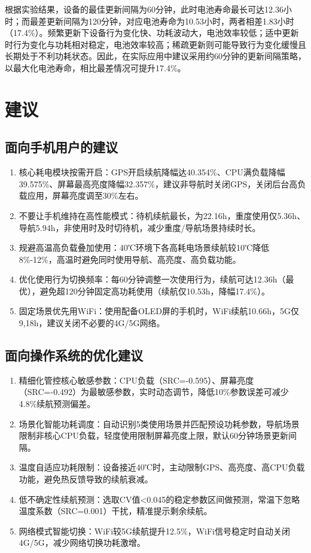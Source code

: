 \documentclass{mcmthesis}  %
\begin{document}
	根据实验结果，设备的最佳更新间隔为60分钟，此时电池寿命最长可达12.36小时；而最差更新间隔为120分钟，对应电池寿命为10.53小时，两者相差1.83小时（17.4\%）。频繁更新下设备行为变化快、功耗波动大，电池效率较低；适中更新时行为变化与功耗相对稳定，电池效率较高；稀疏更新则可能导致行为变化缓慢且长期处于不利功耗状态。因此，在实际应用中建议采用约60分钟的更新间隔策略，以最大化电池寿命，相比最差情况可提升17.4\%。
	
	
	
	\section{建议}  %
	\subsection{面向手机用户的建议}
	
	
	\begin{enumerate}[label=\arabic*.]
		\item 核心耗电模块按需开启：GPS开启续航降幅达40.354\%、CPU满负载降幅39.575\%、屏幕最高亮度降幅32.357\%，建议非导航时关闭GPS，关闭后台高负载应用，屏幕亮度调至30\%左右。
		\item 不要让手机维持在高性能模式：待机续航最长，为22.16h，重度使用仅5.36h、导航5.94h，非使用时及时切待机，减少重度/导航场景持续时长。
		\item 规避高温高负载叠加使用：40℃环境下各高耗电场景续航较10℃降低8\%-12\%，高温时避免同时使用导航、高亮度、高负载功能。
		\item 优化使用行为切换频率：每60分钟调整一次使用行为，续航可达12.36h（最优），避免超120分钟固定高功耗使用（续航仅10.53h，降幅17.4\%）。
		\item 固定场景优先用WiFi：使用配备OLED屏的手机时，WiFi续航10.66h，5G仅9,18h，建议关闭不必要的4G/5G网络。
	\end{enumerate}
	
	
	
	\subsection{面向操作系统的优化建议}
	
	
	\begin{enumerate}[label=\arabic*.]
		\item 精细化管控核心敏感参数：CPU负载（SRC=-0.595）、屏幕亮度（SRC=-0.492）为最敏感参数，实时动态调节，降低10\%参数误差可减少4.8\%续航预测偏差。
		\item 场景化智能功耗调度：自动识别5类使用场景并匹配预设功耗参数，导航场景限制非核心CPU负载，轻度使用限制屏幕亮度上限，默认60分钟场景更新间隔。
		\item 温度自适应功耗限制：设备接近40℃时，主动限制GPS、高亮度、高CPU负载功能，避免热反馈导致的续航衰减。
		\item 低不确定性续航预测：选取CV值<0.045的稳定参数区间做预测，常温下忽略温度系数（SRC=0.001）干扰，精准提示剩余续航。
		\item 网络模式智能切换：WiFi较5G续航提升12.5\%，WiFi信号稳定时自动关闭4G/5G，减少网络切换功耗激增。
	\end{enumerate}
	
\end{document}
